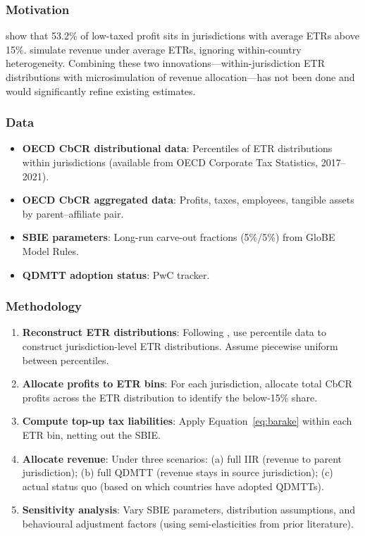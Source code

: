 \documentclass[11pt,a4paper]{article}
\begin{document}
\subsubsection{Motivation}
\citet{hugger2025} show that 53.2\% of low-taxed profit sits in jurisdictions with average ETRs above 15\%. \citet{barake2022} simulate revenue under average ETRs, ignoring within-country heterogeneity. Combining these two innovations---within-jurisdiction ETR distributions with microsimulation of revenue allocation---has not been done and would significantly refine existing estimates.

\subsubsection{Data}
\begin{itemize}[nosep]
    \item \textbf{OECD CbCR distributional data}: Percentiles of ETR distributions within jurisdictions (available from OECD Corporate Tax Statistics, 2017--2021).
    \item \textbf{OECD CbCR aggregated data}: Profits, taxes, employees, tangible assets by parent--affiliate pair.
    \item \textbf{SBIE parameters}: Long-run carve-out fractions (5\%/5\%) from GloBE Model Rules.
    \item \textbf{QDMTT adoption status}: PwC tracker.
\end{itemize}

\subsubsection{Methodology}
\begin{enumerate}[nosep]
    \item \textbf{Reconstruct ETR distributions}: Following \citet{hugger2025}, use percentile data to construct jurisdiction-level ETR distributions. Assume piecewise uniform between percentiles.
    \item \textbf{Allocate profits to ETR bins}: For each jurisdiction, allocate total CbCR profits across the ETR distribution to identify the below-15\% share.
    \item \textbf{Compute top-up tax liabilities}: Apply Equation~\eqref{eq:barake} within each ETR bin, netting out the SBIE.
    \item \textbf{Allocate revenue}: Under three scenarios: (a) full IIR (revenue to parent jurisdiction); (b) full QDMTT (revenue stays in source jurisdiction); (c) actual status quo (based on which countries have adopted QDMTTs).
    \item \textbf{Sensitivity analysis}: Vary SBIE parameters, distribution assumptions, and behavioural adjustment factors (using semi-elasticities from prior literature).
\end{enumerate}
\end{document}

